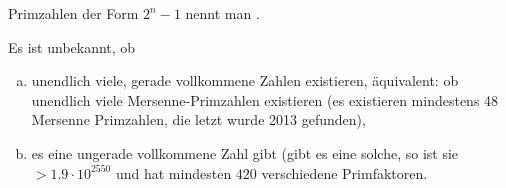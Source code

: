 \begin{df}
	Primzahlen der Form $2^n - 1$ nennt man .
\end{df}

\begin{nt}
	Es ist unbekannt, ob
	\begin{enumerate}[a)]
		\item
			unendlich viele, gerade vollkommene Zahlen existieren, äquivalent: ob unendlich viele Mersenne-Primzahlen existieren (es existieren mindestens 48 Mersenne Primzahlen, die letzt wurde 2013 gefunden),
		\item
			es eine ungerade vollkommene Zahl gibt (gibt es eine solche, so ist sie $> 1.9 \cdot 10^{2550}$ und hat mindesten $420$ verschiedene Primfaktoren.
	\end{enumerate}
\end{nt}










